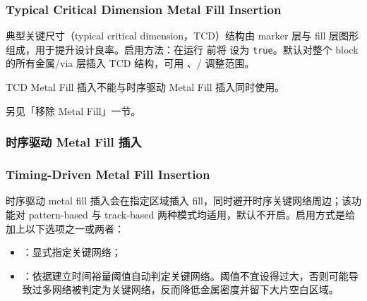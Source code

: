 \subsubsection*{Typical Critical Dimension Metal Fill Insertion}

典型关键尺寸（typical critical dimension，TCD）结构由 marker 层与 fill 层图形组成，用于提升设计良率。启用方法：在运行  前将  设为 \texttt{true}。默认对整个 block 的所有金属/via 层插入 TCD 结构，可用 、/ 调整范围。

\begin{noteBox}
TCD Metal Fill 插入不能与时序驱动 Metal Fill 插入同时使用。
\end{noteBox}

\begin{seeAlsoBox}
另见「移除 Metal Fill」一节。
\end{seeAlsoBox}

\subsubsection{时序驱动 Metal Fill 插入}
\subsubsection*{Timing-Driven Metal Fill Insertion}

时序驱动 metal fill 插入会在指定区域插入 fill，同时避开时序关键网络周边；该功能对 pattern-based 与 track-based 两种模式均适用，默认不开启。启用方式是给  加上以下选项之一或两者：
\begin{itemize}
  \item {}：显式指定关键网络；
  \item {}：依据建立时间裕量阈值自动判定关键网络。阈值不宜设得过大，否则可能导致过多网络被判定为关键网络，反而降低金属密度并留下大片空白区域。
\end{itemize}

